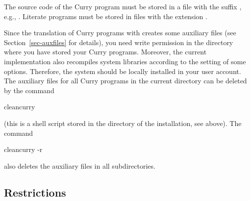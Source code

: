 The source code of the Curry program
must be stored in a file with the suffix ,
e.g., .
Literate programs must be stored in files with the extension .

Since the translation of Curry programs with \CYS creates
some auxiliary files (see Section~\ref{sec-auxfiles} for details),
you need write permission
in the directory where you have stored your Curry programs.
Moreover, the current implementation also recompiles
system libraries according to the setting of some options.
Therefore, the \CYS system should be locally installed
in your user account.
The auxiliary files for all Curry programs in the current
directory can be deleted by the command
\begin{curry}
cleancurry
\end{curry}
(this is a shell script stored in the  directory of the
\CYS installation, see above).
The command
\begin{curry}
cleancurry -r
\end{curry}
also deletes the auxiliary files in all subdirectories.



\subsection{Restrictions}
\label{sec-restrictions}

